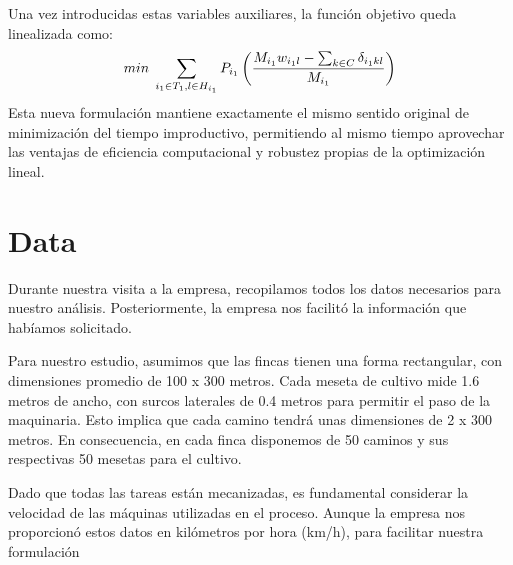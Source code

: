     Una vez introducidas estas variables auxiliares, la función objetivo queda linealizada como:
	\[
        min\hspace{0.1cm} \sum_{i_1 \in T_1, l\in H_{i_1}}P_{i_1}\left(\frac{M_{i_1}w_{i_1 l}-\sum_{k\in C}\delta_{i_1 k l}}{M_{i_1}}\right)
    \]
	Esta nueva formulación mantiene exactamente el mismo sentido original de minimización del tiempo improductivo,
    permitiendo al mismo tiempo aprovechar las ventajas de eficiencia computacional y robustez propias de la optimización lineal.



\chapter*{Data}

Durante nuestra visita a la empresa, recopilamos todos los datos necesarios para nuestro análisis. 
Posteriormente, la empresa nos facilitó la información que habíamos solicitado.

Para nuestro estudio, asumimos que las fincas tienen una forma rectangular, con dimensiones promedio
de 100 x 300 metros. Cada meseta de cultivo mide 1.6 metros de ancho, con surcos laterales de 0.4 metros
para permitir el paso de la maquinaria. Esto implica que cada camino tendrá unas dimensiones de 2 x 300 metros.
En consecuencia, en cada finca disponemos de 50 caminos y sus respectivas 50 mesetas para el cultivo.

Dado que todas las tareas están mecanizadas, es fundamental considerar la velocidad de las máquinas utilizadas en el
proceso. Aunque la empresa nos proporcionó estos datos en kilómetros por hora (km/h), para facilitar nuestra formulación 

